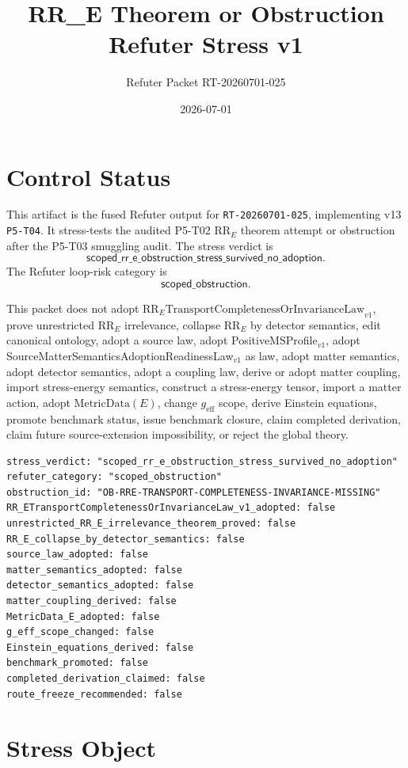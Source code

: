 \documentclass[11pt]{article}
\title{RR\_E Theorem or Obstruction Refuter Stress v1}
\author{Refuter Packet RT-20260701-025}
\date{2026-07-01}
\newcommand{\RRE}{\mathrm{RR}_{E}}
\newcommand{\MetricData}{\mathrm{MetricData}}
\newcommand{\geff}{g_{\mathrm{eff}}}
\newcommand{\MissingLaw}{\mathrm{RR}_{E}\mathrm{TransportCompletenessOrInvarianceLaw}_{v1}}
\newcommand{\StressVerdict}{\mathsf{scoped\_rr\_e\_obstruction\_stress\_survived\_no\_adoption}}
\begin{document}
\maketitle

\section{Control Status}

This artifact is the fused Refuter output for \texttt{RT-20260701-025},
implementing v13 \texttt{P5-T04}. It stress-tests the audited P5-T02
\(\RRE\) theorem attempt or obstruction after the P5-T03 smuggling audit.
The stress verdict is
\[
  \StressVerdict .
\]
The Refuter loop-risk category is
\[
  \mathsf{scoped\_obstruction}.
\]

This packet does not adopt \(\MissingLaw\), prove unrestricted \(\RRE\)
irrelevance, collapse \(\RRE\) by detector semantics, edit canonical ontology,
adopt a source law, adopt PositiveMSProfile\(_{v1}\), adopt
SourceMatterSemanticsAdoptionReadinessLaw\(_{v1}\) as law, adopt matter
semantics, adopt detector semantics, adopt a coupling law, derive or adopt
matter coupling, import stress-energy semantics, construct a stress-energy
tensor, import a matter action, adopt \(\MetricData(E)\), change \(\geff\)
scope, derive Einstein equations, promote benchmark status, issue benchmark
closure, claim completed derivation, claim future source-extension
impossibility, or reject the global theory.

\begin{verbatim}
stress_verdict: "scoped_rr_e_obstruction_stress_survived_no_adoption"
refuter_category: "scoped_obstruction"
obstruction_id: "OB-RRE-TRANSPORT-COMPLETENESS-INVARIANCE-MISSING"
RR_ETransportCompletenessOrInvarianceLaw_v1_adopted: false
unrestricted_RR_E_irrelevance_theorem_proved: false
RR_E_collapse_by_detector_semantics: false
source_law_adopted: false
matter_semantics_adopted: false
detector_semantics_adopted: false
matter_coupling_derived: false
MetricData_E_adopted: false
g_eff_scope_changed: false
Einstein_equations_derived: false
benchmark_promoted: false
completed_derivation_claimed: false
route_freeze_recommended: false
\end{verbatim}

\section{Stress Object}
\end{document}
